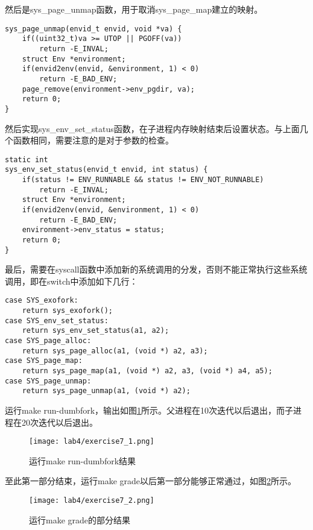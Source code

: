\begin{exerciseSolution}{7}
    \par 然后是sys\_page\_unmap函数，用于取消sys\_page\_map建立的映射。

    \begin{lstlisting}
sys_page_unmap(envid_t envid, void *va) {
    if((uint32_t)va >= UTOP || PGOFF(va))
        return -E_INVAL;
    struct Env *environment;
    if(envid2env(envid, &environment, 1) < 0)
        return -E_BAD_ENV;
    page_remove(environment->env_pgdir, va);
    return 0;
}
    \end{lstlisting}

    \par 然后实现sys\_env\_set\_status函数，在子进程内存映射结束后设置状态。与上面几个函数相同，需要注意的是对于参数的检查。
    \begin{lstlisting}
static int
sys_env_set_status(envid_t envid, int status) {
    if(status != ENV_RUNNABLE && status != ENV_NOT_RUNNABLE)
        return -E_INVAL;
    struct Env *environment;
    if(envid2env(envid, &environment, 1) < 0)
        return -E_BAD_ENV;
    environment->env_status = status;
    return 0;
}
    \end{lstlisting}

    \par 最后，需要在syscall函数中添加新的系统调用的分发，否则不能正常执行这些系统调用，即在switch中添加如下几行：
    \begin{lstlisting}
case SYS_exofork:
    return sys_exofork();
case SYS_env_set_status:
    return sys_env_set_status(a1, a2);
case SYS_page_alloc:
    return sys_page_alloc(a1, (void *) a2, a3);
case SYS_page_map:
    return sys_page_map(a1, (void *) a2, a3, (void *) a4, a5);
case SYS_page_unmap:
    return sys_page_unmap(a1, (void *) a2);
    \end{lstlisting}

    \par 运行make run-dumbfork，输出如图\ref{fig:lab4/exercise7_1}所示。父进程在10次迭代以后退出，而子进程在20次迭代以后退出。
    \begin{figure}[htb]
        \centering
        \texttt{[image: lab4/exercise7\_1.png]}
        \caption{运行make run-dumbfork结果}
        \label{fig:lab4/exercise7_1}
    \end{figure}
    \FloatBarrier
\end{exerciseSolution}
\par 至此第一部分结束，运行make grade以后第一部分能够正常通过，如图\ref{fig:lab4/exercise7_2}所示。
\begin{figure}[htb]
    \centering
    \texttt{[image: lab4/exercise7\_2.png]}
    \caption{运行make grade的部分结果}
    \label{fig:lab4/exercise7_2}
\end{figure}

